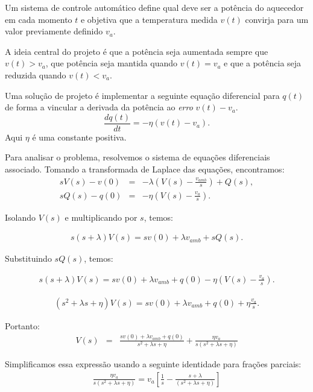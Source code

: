   Um sistema de controle automático define qual deve ser a potência do aquecedor em cada momento $t$ e objetiva que a temperatura medida $v(t)$ convirja para um valor previamente definido $v_a$.

  A ideia central do projeto é que a potência seja aumentada sempre que $v(t)>v_a$, que potência seja mantida quando $v(t)=v_a$ e que a potência seja reduzida quando $v(t)<v_a$.

  Uma solução de projeto é implementar a seguinte equação diferencial para $q(t)$ de forma a vincular a derivada da potência ao \emph{erro} $v(t)-v_a$.
    \begin {equation} \label{forno_eq_pot}
    \frac{dq(t)}{dt} =-\eta \left(v(t)-v_a\right).
   \end {equation} 
   Aqui $\eta$ é uma constante positiva.


   Para analisar o problema, resolvemos o sistema de equações diferenciais associado.
Tomando a transformada de Laplace das  equações, encontramos:
  \begin{eqnarray*}
   sV(s)-v(0) &=& -\lambda \left(V(s)-\frac{v_{amb}}{s}\right) + Q(s),\\
   sQ(s)-q(0) &=& -\eta \left(V(s)-\frac{v_a}{s}\right).
   \end{eqnarray*}

  Isolando $V(s)$ e multiplicando por $s$, temos:

 \begin {eqnarray}\label{forno_Vs}
   s(s+\lambda)V(s)=sv(0)+\lambda {v_{amb}} + sQ(s).
 \end {eqnarray}
   
Substituindo $sQ(s)$, temos:

 \begin {eqnarray*}
   s(s+\lambda)V(s)=sv(0)+\lambda {v_{amb}} +q(0)-\eta \left(V(s)-\frac{v_a}{s}\right).
\end {eqnarray*}

\begin {eqnarray*}
\left(s^2+\lambda s+\eta\right)V(s)=sv(0)+\lambda {v_{amb}} +q(0) + \eta \frac{v_a}{s}.
\end {eqnarray*}

Portanto:
\begin {eqnarray*}
V(s) &=& \frac{sv(0)+\lambda {v_{amb}} +q(0)}{s^2+\lambda s+\eta} +  \frac{\eta v_a}{s\left(s^2+\lambda s+\eta\right)}
\end {eqnarray*}

Simplificamos essa expressão usando a seguinte identidade para frações parciais:
\begin {eqnarray*}
\frac{\eta v_a }{s\left(s^2+\lambda s+\eta\right)} = v_a\left[\frac{1}{ s}-\frac{s+\lambda}{(s^2+\lambda s + \eta)}\right]
\end {eqnarray*}

